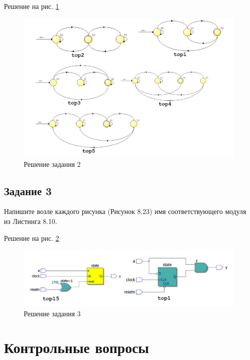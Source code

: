 \documentclass[a4paper,14pt]{article}
\begin{document}
	Решение на рис. \ref{fig:extra_2}
	
	\begin{figure}[H]
		\centering
		\includegraphics[width=\linewidth]{images/extra_2}
		\caption{Решение задания 2}
		\label{fig:extra_2}
	\end{figure}
	
	
	\subsection{Задание 3}
	
	Напишите возле каждого рисунка (Рисунок 8.23) имя соответствующего модуля из Листинга 8.10.
	
	Решение на рис. \ref{fig:extra_3}
	
	\begin{figure}[H]
		\centering
		\includegraphics[width=\linewidth]{images/extra_3}
		\caption{Решение задания 3}
		\label{fig:extra_3}
	\end{figure}

	\section{Контрольные вопросы}
	
\end{document}
